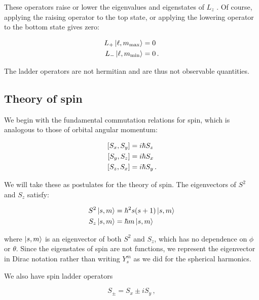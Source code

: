 \documentclass[12pt, titlepage]{article}
\begin{document}

These operators raise or lower the eigenvalues and eigenstates of $L_{z}$ . Of course, applying the raising operator to the top state, or applying the lowering operator to the bottom state gives zero:

\begin{subequations}
\begin{align}
	L_{+}\ket{\ell, m_{\text{max}}} &= 0 \\
	L_{-}\ket{\ell, m_{\text{min}}} &= 0 \, .
\end{align}
\end{subequations}

The ladder operators are not hermitian and are thus not observable quantities.
\subsection{Theory of spin}
 We begin with the fundamental commutation relations for spin, which is analogous to those of orbital angular momentum:
 
 \begin{subequations}
 	\begin{align}
 	\comm{S_{x}}{S_{y}} &= i \hbar S_{z} \\
 	\comm{S_{y}}{S_{z}} &= i \hbar S_{x} \\
 	\comm{S_{z}}{S_{x}} &= i \hbar S_{y} \, .
 	\end{align}
 \end{subequations}

We will take these as postulates for the theory of spin. The eigenvectors of $S^2$ and $S_{z}$ satisfy:

\begin{align}
	S^2 \ket{s, m} &= \hbar^2 s(s+1)\ket{s, m} \\
	S_{z} \ket{s, m} &= \hbar m \ket{s, m}
\end{align}

where $\ket{s, m}$ is an eigenvector of both $S^2$ and $S_z$, which has no dependence on $\phi$ or $\theta$. Since the eigenstates of spin are not functions, we represent the eigenvector in Dirac notation rather than writing $Y_{s}^{m}$ as we did for the spherical harmonics.


We also have spin ladder operators

\begin{equation}
	S_{\pm} = S_{x} \pm i S_{y} \,,
\end{equation}
\end{document}
